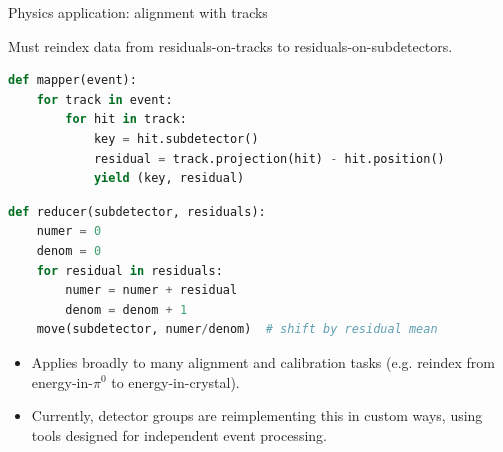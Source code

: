 \documentclass{beamer}
\begin{document}
\begin{frame}[fragile]{Physics application: alignment with tracks}

Must reindex data from residuals-on-tracks to \mbox{residuals-on-subdetectors.\hspace{-1 cm}}

\vfill
\begin{lstlisting}[language=python,frame=single]
def mapper(event):
    for track in event:
        for hit in track:
            key = hit.subdetector()
            residual = track.projection(hit) - hit.position()
            yield (key, residual)
\end{lstlisting}

\begin{lstlisting}[language=python,frame=single]
def reducer(subdetector, residuals):
    numer = 0
    denom = 0
    for residual in residuals:
        numer = numer + residual
        denom = denom + 1
    move(subdetector, numer/denom)  # shift by residual mean
\end{lstlisting}

\vfill
\begin{itemize}
\item Applies broadly to many alignment and calibration tasks (e.g. reindex from energy-in-$\pi^0$ to energy-in-crystal).
\item Currently, detector groups are reimplementing this in custom ways, using tools designed for independent event processing.
\end{itemize}
\end{frame}
\end{document}

